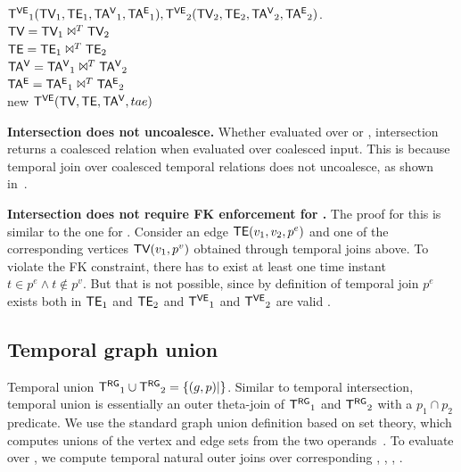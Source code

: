 \begin{algorithm}
\caption{Temporal graph intersection in \tve.}
\begin{algorithmic}[1]
\REQUIRE $\mathsf{T^{VE}}_1 (\textsf{TV}_1, \textsf{TE}_1, \mathsf{TA^{V}}_1, \mathsf{TA^{E}}_1), \mathsf{T^{VE}}_2 (\textsf{TV}_2, \textsf{TE}_2, \mathsf{TA^{V}}_2, \mathsf{TA^{E}}_2)$.\\
\STATE $\textsf{TV} = \textsf{TV}_1 \Join^T \textsf{TV}_2$\\
\STATE $\textsf{TE} = \textsf{TE}_1 \Join^T \textsf{TE}_2$\\
\STATE $\mathsf{TA^{V}} = \mathsf{TA^{V}}_1 \Join^T \mathsf{TA^{V}}_2$\\
\STATE $\mathsf{TA^{E}} = \mathsf{TA^{E}}_1 \Join^T \mathsf{TA^{E}}_2$\\
\RETURN new $\mathsf{T^{VE}} (\textsf{TV}, \textsf{TE}, \mathsf{TA^{V}}, tae)$\\
\end{algorithmic}
\label{alg:inter}
\end{algorithm}


{\bf Intersection does not uncoalesce.}  Whether evaluated over \trg
or \tve, intersection returns a coalesced relation when evaluated over
coalesced input.  This is because temporal join over coalesced
temporal relations does not uncoalesce, as shown
in~\cite{DBLP:conf/vldb/BohlenSS96}.

{\bf Intersection does not require FK enforcement for \tve.}  The
proof for this is similar to the one for .  Consider an
edge $\textsf{TE}(v_1, v_2, p^e)$ and one of the corresponding vertices
$\textsf{TV}(v_1, p^v)$ obtained through temporal joins above.  To violate the
FK constraint, there has to exist at least one time instant $t \in p^e
\wedge t \not\in p^v$.  But that is not possible, since by definition
of temporal join $p^e$ exists both in $\textsf{TE}_1$ and $\textsf{TE}_2$ and $\mathsf{T^{VE}}_1$
and $\mathsf{T^{VE}}_2$ are valid \tgs.

\subsection{Temporal graph union}
\label{sec:algebra:outerjoin}

Temporal union $\mathsf{T^{RG}}_1 \cup \mathsf{T^{RG}}_2 = \{ (g, p) | \}$.  Similar to
temporal intersection, temporal union is essentially an outer
theta-join of $\mathsf{T^{RG}}_1$ and $\mathsf{T^{RG}}_2$ with a $p_1 \cap p_2$ predicate.
We use the standard graph union definition based on set theory, which
computes unions of the vertex and edge sets from the two
operands~\cite{GraphTheory}.  To evaluate over \tve, we compute
temporal natural outer joins over corresponding \tv, \te, \tav, \tae.

